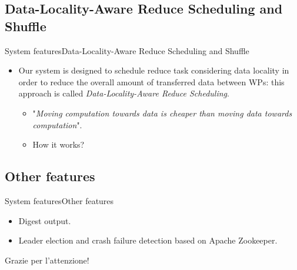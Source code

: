 \documentclass[10pt]{beamer}
\begin{document}
\subsection{Data-Locality-Aware Reduce Scheduling and Shuffle}

\begin{frame}{System features}{Data-Locality-Aware Reduce Scheduling and Shuffle}

\begin{itemize}

\item Our system is designed to schedule reduce task considering data locality in order to reduce the overall amount of transferred data between WPs: this approach is called \textit{Data-Locality-Aware Reduce Scheduling}.
\vspace{10pt}
\begin{itemize}

\item "\textit{Moving computation towards data is cheaper than moving data towards computation}".
\item How it works?


\end{itemize}

\end{itemize}

\end{frame}

\subsection{Other features}

\begin{frame}{System features}{Other features}

\begin{itemize}
\item Digest output.
\item Leader election and crash failure detection based on Apache Zookeeper.
\end{itemize}

\end{frame}

\begin{frame}
  Grazie per l'attenzione!
\end{frame}
\end{document}
